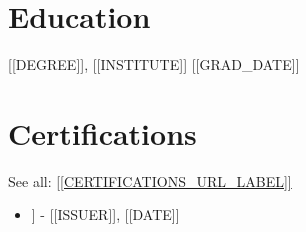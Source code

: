 \documentclass[10pt,a4paper]{article}
\begin{document}
\section*{Education}
[[DEGREE]], [[INSTITUTE]] \hfill [[GRAD\_DATE]]

\section*{Certifications}
See all: \href{[[CERTIFICATIONS\_URL]]}{[[CERTIFICATIONS\_URL\_LABEL]]}
\begin{itemize}
  \item [[CERT\_NAME]] - [[ISSUER]], [[DATE]]
\end{itemize}
\end{document}
